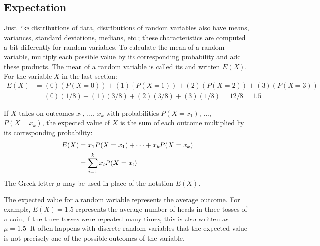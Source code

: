 
\subsection{Expectation}


Just like distributions of data, distributions of random variables also have means, variances, standard deviations, medians, etc.; these characteristics are computed a bit differently for random variables. To calculate the mean of a random variable, multiply each possible value by its corresponding probability and add these products. The mean of a random variable is called its  and written $E(X)$. For the variable $X$ in the last section:
\vspace{0mm}
\begin{align*}
E(X) &= (0)(P(X=0)) + (1)(P(X=1)) + (2)(P(X=2)) + (3)(P(X = 3)) \\
	&= (0)(1/8) + (1)(3/8) + (2)(3/8) + (3)(1/8) = 12/8 = 1.5
\end{align*}

\begin{termBox}{
If $X$ takes on outcomes $x_1$, ..., $x_k$ with probabilities $P(X=x_1)$, ..., $P(X=x_k)$, the expected value of $X$ is the sum of each outcome multiplied by its corresponding probability:
\begin{align}
E(X) 	&= x_1 P(X=x_1) + \cdots + x_k P(X=x_k) \notag \\
	&= \sum_{i=1}^{k}x_iP(X=x_i)
\end{align}
The Greek letter $\mu$ may be used in place of the notation $E(X)$.}
\end{termBox}
The expected value for a random variable represents the average outcome. For example, $E(X)=1.5$ represents the average number of heads in three tosses of a coin, if the three tosses were repeated many times; this is also written as $\mu=1.5$.  It often happens with discrete random variables that the expected value is not precisely one of the possible outcomes of the variable.

